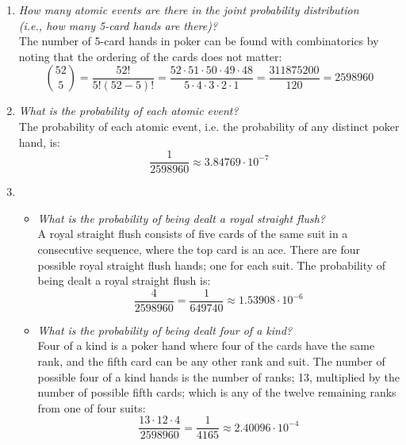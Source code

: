 \begin{enumerate}[label=\alph*)]
\item \textit{How many atomic events are there in the joint probability distribution\\(i.e., how many 5-card hands are there)?}\\
The number of 5-card hands in poker can be found with combinatorics by noting that the ordering of the cards does not matter:
\begin{equation}
\binom{52}{5} =
\frac{52!}{5!(52 - 5)!} =
\frac{52 \cdot 51 \cdot 50 \cdot 49 \cdot 48}{5 \cdot 4 \cdot 3 \cdot 2 \cdot 1} =
\frac{311875200}{120} =
2598960
\end{equation}
\item \textit{What is the probability of each atomic event?}\\
The probability of each atomic event, i.e. the probability of any distinct poker hand, is:
\begin{equation}
\frac{1}{2598960} \approx 3.84769 \cdot 10^{-7}
\end{equation}
\item
\begin{itemize}
\item \textit{What is the probability of being dealt a royal straight flush?}\\
A royal straight flush consists of five cards of the same suit in a consecutive sequence, where the top card is an ace. There are four possible royal straight flush hands; one for each suit. The probability of being dealt a royal straight flush is:
\begin{equation}
\frac{4}{2598960} = \frac{1}{649740} \approx 1.53908 \cdot 10^{-6}
\end{equation}
\item \textit{What is the probability of being dealt four of a kind?}\\
Four of a kind is a poker hand where four of the cards have the same rank, and the fifth card can be any other rank and suit. The number of possible four of a kind hands is the number of ranks; 13, multiplied by the number of possible fifth cards; which is any of the twelve remaining ranks from one of four suits:
\begin{equation}
\frac{13 \cdot 12 \cdot 4}{2598960} = \frac{1}{4165} \approx 2.40096 \cdot 10^{-4}
\end{equation}
\end{itemize}
\end{enumerate}

